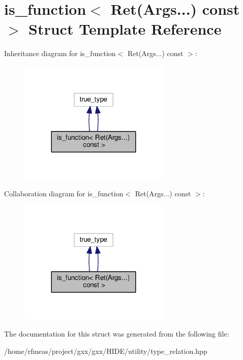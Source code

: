 \hypertarget{structis__function_3_01Ret_07Args_8_8_8_08_01const_01_01_4}{}\section{is\+\_\+function$<$ Ret(Args...) const $>$ Struct Template Reference}
\label{structis__function_3_01Ret_07Args_8_8_8_08_01const_01_01_4}


Inheritance diagram for is\+\_\+function$<$ Ret(Args...) const $>$\+:
\nopagebreak
\begin{figure}[H]
\begin{center}
\leavevmode
\includegraphics[width=204pt]{structis__function_3_01Ret_07Args_8_8_8_08_01const_01_01_4__inherit__graph}
\end{center}
\end{figure}


Collaboration diagram for is\+\_\+function$<$ Ret(Args...) const $>$\+:
\nopagebreak
\begin{figure}[H]
\begin{center}
\leavevmode
\includegraphics[width=204pt]{structis__function_3_01Ret_07Args_8_8_8_08_01const_01_01_4__coll__graph}
\end{center}
\end{figure}


The documentation for this struct was generated from the following file\+:\begin{DoxyCompactItemize}
\item 
/home/rfmeas/project/gxx/gxx/\+H\+I\+D\+E/utility/type\+\_\+relation.\+hpp\end{DoxyCompactItemize}
